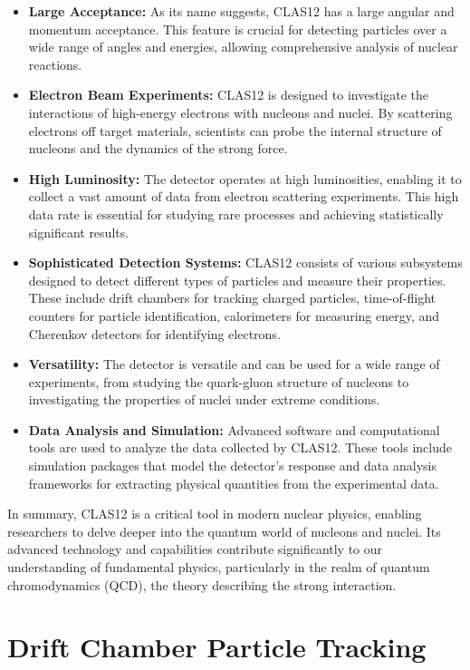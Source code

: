 \documentclass[preprint,12pt]{elsarticle}
\begin{document}
\begin{itemize}

\item{\bf Large Acceptance: }As its name suggests, CLAS12 has a large angular and momentum acceptance. This feature is crucial for detecting particles over a wide range of angles and energies, allowing comprehensive analysis of nuclear reactions.
\item{\bf Electron Beam Experiments:} CLAS12 is designed to investigate the interactions of high-energy electrons with nucleons and nuclei. By scattering electrons off target materials, scientists can probe the internal structure of nucleons and the dynamics of the strong force.
\item{\bf High Luminosity:} The detector operates at high luminosities, enabling it to collect a vast amount of data from electron scattering experiments. This high data rate is essential for studying rare processes and achieving statistically significant results.
\item{\bf Sophisticated Detection Systems:} CLAS12 consists of various subsystems designed to detect different types of particles and measure their properties. These include drift chambers for tracking charged particles, time-of-flight counters for particle identification, calorimeters for measuring energy, and Cherenkov detectors for identifying electrons.
\item{\bf Versatility:} The detector is versatile and can be used for a wide range of experiments, from studying the quark-gluon structure of nucleons to investigating the properties of nuclei under extreme conditions.
\item{\bf Data Analysis and Simulation:} Advanced software and computational tools are used to analyze the data collected by CLAS12. These tools include simulation packages that model the detector's response and data analysis frameworks for extracting physical quantities from the experimental data.
\end{itemize}
In summary, CLAS12 is a critical tool in modern nuclear physics, enabling researchers to delve deeper into the quantum world of nucleons and nuclei. Its advanced technology and capabilities contribute significantly to our understanding of fundamental physics, particularly in the realm of quantum chromodynamics (QCD), the theory describing the strong interaction.

\section{Drift Chamber Particle Tracking}
\end{document}
